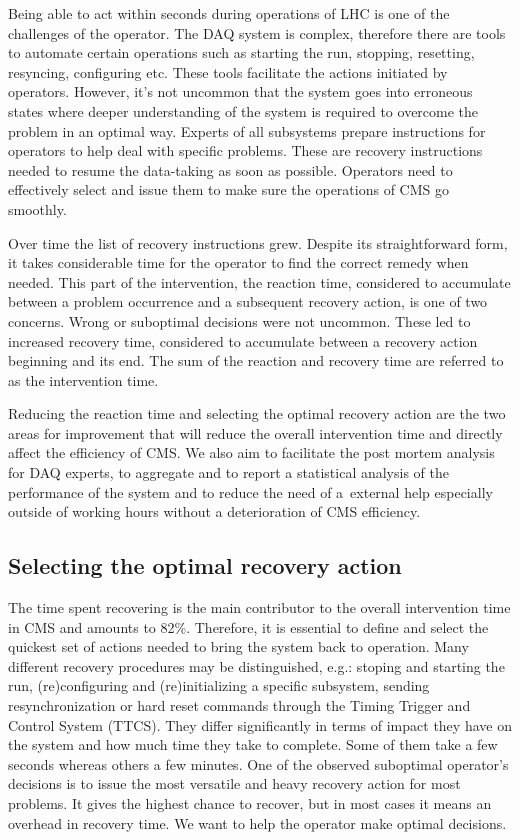 \documentclass[a4paper]{jpconf}
\begin{document}
Being able to act within seconds during operations of LHC is one of the challenges of the operator. The DAQ system is complex, therefore there are tools to automate certain operations such as starting the run, stopping, resetting, resyncing, configuring etc. These tools facilitate the actions initiated by operators. However, it's not uncommon that the system goes into erroneous states where deeper understanding of the system is required to overcome the problem in an optimal way. Experts of all subsystems prepare instructions for operators to help deal with specific problems. These are recovery instructions needed to resume the data-taking as soon as possible. Operators need to effectively select and issue them to make sure the operations of CMS go smoothly.

Over time the list of recovery instructions grew. Despite its straightforward form, it takes considerable time for the operator to find the correct remedy when needed. This part of the intervention, the reaction time, considered to accumulate between a problem occurrence and a subsequent recovery action, is one of two concerns. Wrong or suboptimal decisions were not uncommon. These led to increased recovery time, considered to accumulate between a recovery action beginning and its end. The sum of the reaction and recovery time are referred to as the intervention time.

Reducing the reaction time and selecting the optimal recovery action are the two areas for improvement that will reduce the overall intervention time and directly affect the efficiency of CMS. We also aim to facilitate the post mortem analysis for DAQ experts, to aggregate and to report a statistical analysis of the performance of the system and to reduce the need of a~external help especially outside of working hours without a deterioration of CMS efficiency. 

\subsection{Selecting the optimal recovery action}
The time spent recovering is the main contributor to the overall intervention time in CMS and amounts to 82\%. Therefore, it is essential to define and select the quickest set of actions needed to bring the system back to operation. Many different recovery procedures may be distinguished, e.g.: stoping and starting the run, (re)configuring and (re)initializing a specific subsystem, sending resynchronization or hard reset commands through the Timing Trigger and Control System (TTCS). They differ significantly in terms of impact they have on the system and how much time they take to complete. Some of them take a few seconds whereas others a few minutes. One of the observed suboptimal operator's decisions is to issue the most versatile and heavy recovery action for most problems. It gives the highest chance to recover, but in most cases it means an overhead in recovery time. We want to help the operator make optimal decisions.
\end{document}
